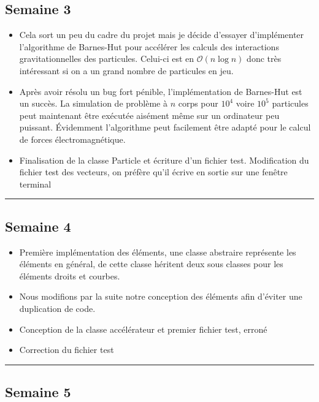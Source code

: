 \documentclass[12pt, letterpaper, twoside]{article}
\begin{document}
\subsection{Semaine 3}
\begin{itemize}
\item Cela sort un peu du cadre du projet mais je décide d'essayer d'implémenter l'algorithme de Barnes-Hut pour accélérer les calculs des interactions gravitationnelles des particules. Celui-ci est en  $\mathcal{O}(n\log{}n)$ donc très intéressant si on a un grand nombre de particules en jeu.

\item Après avoir résolu un bug fort pénible, l'implémentation de Barnes-Hut est un succès. La simulation de problème à $n$ corps pour $10^4$ voire $10^5$ particules peut maintenant être exécutée aisément même sur un ordinateur peu puissant. Évidemment l'algorithme peut facilement être adapté pour le calcul de forces électromagnétique.

\item Finalisation de la classe Particle et écriture d'un fichier test. Modification du fichier test des vecteurs, on préfère qu'il écrive en sortie sur une fenêtre terminal
\end{itemize}

\rule{\textwidth}{0.4pt}

\subsection{Semaine 4 }

\begin{itemize}
\item Première implémentation des éléments, une classe abstraire représente les éléments en général, de cette classe héritent deux sous classes pour les éléments droits et courbes.

\item Nous modifions par la suite notre conception des éléments afin d'éviter une duplication de code. 

\item Conception de la classe accélérateur et premier fichier test, erroné

\item Correction du fichier test
\end{itemize}

\rule{\textwidth}{0.4pt}

\subsection{Semaine 5 }
\end{document}
